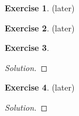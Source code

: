 \documentclass[12pt,a4]{article}
\theoremstyle{definition}
\newtheorem{exercise}{Exercise}
\begin{document}
\begin{exercise}
	(later) 
\end{exercise}

\begin{exercise}
	(later) 
\end{exercise}

\begin{exercise}
	
\end{exercise}
\begin{proof}[Solution]
	
\end{proof}

\begin{exercise}
	(later) 
\end{exercise}
\begin{proof}[Solution]
	
\end{proof}
\end{document}
